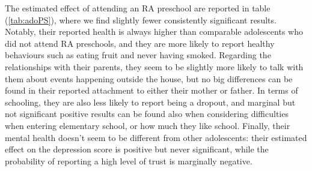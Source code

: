 \documentclass[12pt]{article}
\begin{document}
The estimated effect of attending an RA preschool are reported in table (\ref{tab:adoPS}), where we find slightly fewer consistently significant results. Notably, their reported health is always higher than comparable adolescents who did not attend RA preschools, and they are more likely to report healthy behaviours such as eating fruit and never having smoked. 
Regarding the relationships with their parents, they seem to be slightly more likely to talk with them about events happening outside the house, but no big differences can be found in their reported attachment to either their mother or father. 
In terms of schooling, they are also less likely to report being a dropout, and marginal but not significant positive results can be found also when considering difficulties when entering elementary school, or how much they like school. 
Finally, their mental health doesn't seem to be different from other adolescents: their estimated effect on the depression score is positive but never significant, while the probability of reporting a high level of trust is marginally negative.
\end{document}
